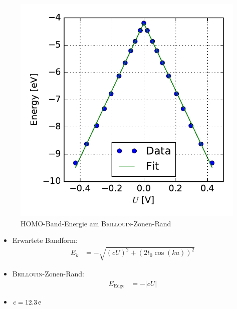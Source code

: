 \begin{frame}
\begin{minipage}{0.49\textwidth}
	\begin{figure}
		\centering
		\includegraphics[width = \textwidth]{Images/Hydrogen/charging/border_energy_q_1}
		\caption{HOMO-Band-Energie am \textsc{Brillouin}-Zonen-Rand}
	\end{figure}
\end{minipage}
\begin{minipage}{0.49\textwidth}
	\begin{itemize}
		\setlength{\itemsep}{.5cm}
		\item Erwartete Bandform:
		\begin{align*}
		E_k &= - \sqrt{\left(cU\right)^2 + \left(2t_0\cos(ka)\right)^2}
		\end{align*}
		\item \textsc{Brillouin}-Zonen-Rand:
		\begin{align*}
		E_\text{Edge} &= -\left|cU\right|
		\end{align*}
		\item $c = \unit[12.3]{e}$
	\end{itemize}
\end{minipage}
\end{frame}

